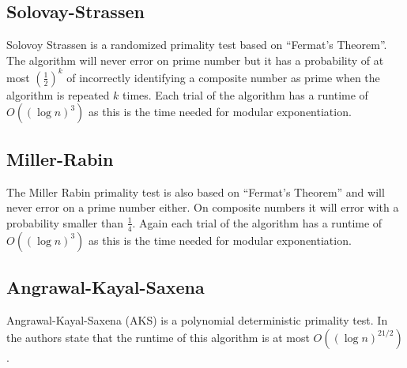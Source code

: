 \subsection{Solovay-Strassen} \label{sec:SS_theory}
Solovoy Strassen is a randomized primality test based on ``Fermat's Theorem''.
The algorithm will never error on prime number but it has a probability of at most $(\frac{1}{2})^k$ of incorrectly identifying a composite number as prime when the algorithm is repeated $k$ times.
Each trial of the algorithm has a runtime of $O((\log n)^3)$ as this is the time needed for modular exponentiation.

\subsection{Miller-Rabin} \label{sec:MR_theory}
The Miller Rabin primality test is also based on ``Fermat's Theorem'' and will never error on a prime number either.
On composite numbers it will error with a probability smaller than $\frac{1}{4}$. \cite{MR}
Again each trial of the algorithm has a runtime of $O((\log n)^3)$ as this is the time needed for modular exponentiation.



\subsection{Angrawal-Kayal-Saxena} \label{sec:AKS_theory}
Angrawal-Kayal-Saxena (AKS) is a polynomial deterministic primality test.
In \cite{AKS} the authors state that the runtime of this algorithm is at most $O((\log n)^{21/2})$.



